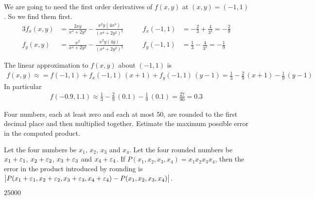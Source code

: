 \begin{solution}
We are going to need
the first order derivatives of $f(x,y)$ at $(x,y)=(-1,1)$.
So we find them first.
\begin{alignat*}{3}
f_x(x,y)&=\frac{2xy}{x^4+2y^2}-\frac{x^2y(4x^3)}{{(x^4+2y^2)}^2}\qquad &
f_x(-1,1)&=-\frac{2}{3} +\frac{4}{3^2}=-\frac{2}{9}
\\
f_y(x,y)&=\frac{x^2}{x^4+2y^2}-\frac{x^2y(4y)}{{(x^4+2y^2)}^2}\qquad &
f_y(-1,1)&=\frac{1}{3} -\frac{4}{3^2}=-\frac{1}{9}
\end{alignat*}

The linear approximation to $f(x,y)$ about $(-1,1)$ is
\begin{align*}
f(x,y)\approx=f(-1,1) + f_x(-1,1)\,(x+1) + f_y(-1,1)\,(y-1)
 =\frac{1}{3} -\frac{2}{9}\,(x+1) -\frac{1}{9}\,(y-1)
\end{align*}
In particular
\begin{align*}
f(-0.9,1.1)\approx \frac{1}{3} -\frac{2}{9}\,(0.1) -\frac{1}{9}\,(0.1)
=\frac{27}{90}=0.3
\end{align*}
\end{solution}

\begin{question}
Four numbers, each at least zero and each at most 50, are rounded to
the first decimal place and then multiplied together. Estimate the maximum
possible error in the computed product.
\end{question}

\begin{hint}
Let the four numbers be $x_1$, $x_2$, $x_3$ and $x_4$.
Let the four rounded numbers be $x_1+\varepsilon_1$, $x_2+\varepsilon_2$, $x_3+\varepsilon_3$ 
and $x_4+\varepsilon_4$. If 
$P(x_1,x_2,x_3,x_4)=x_1x_2x_3x_4$, then the error in the product 
introduced by rounding is
$\big|P(x_1+\varepsilon_1,x_2+\varepsilon_2,x_3+\varepsilon_3,x_4+\varepsilon_4)
-P(x_1,x_2,x_3,x_4)\big|$.
\end{hint}

\begin{answer}
$25000$
\end{answer}

